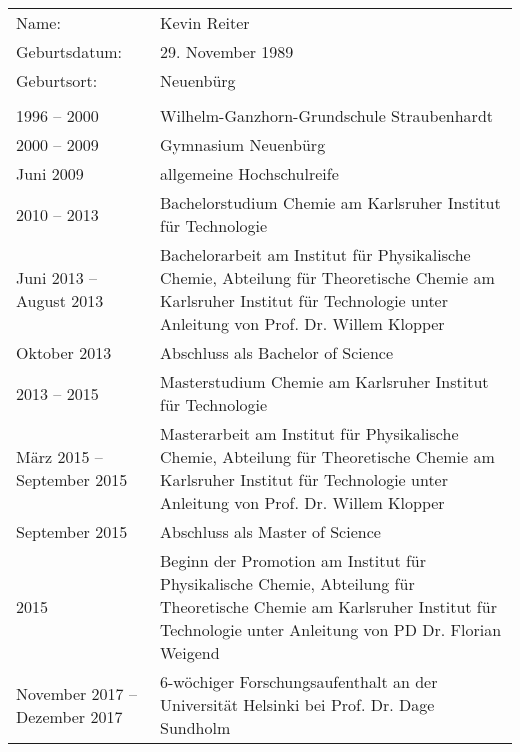 \renewcommand{\arraystretch}{1.7}
\begin{singlespace}
\begin{tabular}{lp{7.6cm}}
Name: & Kevin Reiter \\ 

Geburtsdatum: & 29. November 1989 \\ 

Geburtsort: & Neuenbürg \\ 

\quad & \quad \\

1996 -- 2000 & Wilhelm-Ganzhorn-Grundschule Straubenhardt \\ 

2000 -- 2009 & Gymnasium Neuenbürg \\ 

Juni 2009 & allgemeine Hochschulreife \\ 

2010 -- 2013 & Bachelorstudium Chemie am Karlsruher Institut für Technologie  \\ 
Juni 2013 -- August 2013  & Bachelorarbeit am Institut für Physikalische Chemie, Abteilung für Theoretische Chemie am Karlsruher Institut für Technologie unter Anleitung von Prof. Dr. Willem Klopper \\

Oktober 2013 & Abschluss als Bachelor of Science \\ 
 
2013 -- 2015 & Masterstudium Chemie am Karlsruher Institut für Technologie \\ 

März 2015 -- September 2015  & Masterarbeit am Institut für Physikalische Chemie, Abteilung für Theoretische Chemie am Karlsruher Institut für Technologie unter Anleitung von Prof. Dr. Willem Klopper \\

September 2015 & Abschluss als Master of Science \\ 

2015 & Beginn der Promotion am Institut für Physikalische Chemie, Abteilung für Theoretische Chemie am Karlsruher Institut für Technologie unter Anleitung von PD Dr. Florian Weigend \\ 

November 2017 -- Dezember 2017 & 6-wöchiger Forschungsaufenthalt an der Universität Helsinki bei Prof. Dr. Dage Sundholm \\ 
\end{tabular}  
\end{singlespace}
\enlargethispage{13.5pt}
\vfill